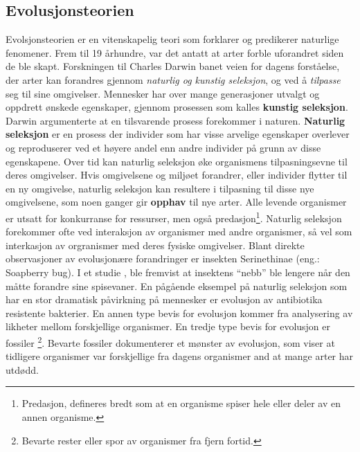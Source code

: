 \documentclass[main.tex]{subfiles}
\begin{document}
\subsection{Evolusjonsteorien}
Evolsjonsteorien er en vitenskapelig teori som forklarer og predikerer naturlige fenomener. Frem til 19 århundre, var det antatt at arter forble uforandret siden de ble skapt. Forskningen til Charles Darwin banet veien for dagens forståelse, der arter kan forandres gjennom \emph{naturlig og kunstig seleksjon}, og ved å \emph{tilpasse} seg til sine omgivelser.
\newline\newline
Mennesker har over mange generasjoner utvalgt og oppdrett ønskede egenskaper, gjennom prosessen som kalles \textbf{kunstig seleksjon}. Darwin argumenterte at en tilsvarende prosess forekommer i naturen. \textbf{Naturlig seleksjon} er en prosess der individer som har visse arvelige egenskaper overlever og reproduserer ved et høyere andel enn andre individer på grunn av disse egenskapene. Over tid kan naturlig seleksjon øke organismens tilpasningsevne til deres omgivelser. Hvis omgivelsene og miljøet forandrer, eller individer flytter til en ny omgivelse, naturlig seleksjon kan resultere i tilpasning til disse nye omgivelsene, som noen ganger gir \textbf{opphav} til nye arter.
\newline\newline
Alle levende organismer er utsatt for konkurranse for ressurser, men også predasjon\footnote{Predasjon, defineres bredt som at en organisme spiser hele eller deler av en annen organisme.}. Naturlig seleksjon forekommer ofte ved interaksjon av organismer med andre organismer, så vel som interkasjon av orgranismer med deres fysiske omgivelser.
\newline\newline
Blant direkte observasjoner av evolusjonære forandringer er insekten Serinethinae (eng.: Soapberry bug). I et studie \cite{cabo92}, ble fremvist at insektens ``nebb'' ble lengere når den måtte forandre sine spisevaner. En pågående eksempel på naturlig seleksjon som har en stor dramatisk påvirkning på mennesker er evolusjon av antibiotika resistente bakterier. En annen type bevis for evolusjon kommer fra analysering av likheter mellom forskjellige organismer. En tredje type bevis for evolusjon er fossiler \footnote{Bevarte rester eller spor av organismer fra fjern fortid.}. Bevarte fossiler dokumenterer et mønster av evolusjon, som viser at tidligere organismer var forskjellige fra dagens organismer and at mange arter har utdødd.
\end{document}
